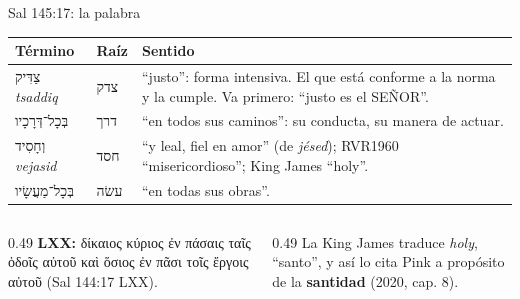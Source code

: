 \documentclass[hyperref={bookmarks=false},aspectratio=169]{beamer}
\newcommand{\heb}[1]{\mbox{\foreignlanguage{hebrew}{#1}}}
\newcommand{\grc}[1]{\foreignlanguage{ancientgreek}{#1}}
\newcommand{\SENOR}{S{\fontsize{0.78em}{1em}\selectfont EÑOR}}
\newcommand{\destacar}[1]{\textbf{\textcolor{azul}{#1}}}
\begin{document}
\begin{frame}{Sal 145:17: la palabra}
\scriptsize\renewcommand{\arraystretch}{1.15}
\begin{tabular}{@{}>{\RaggedRight\arraybackslash}p{2.8cm}>{\RaggedRight\arraybackslash}p{1.1cm}>{\RaggedRight\arraybackslash}p{8.0cm}@{}}
\toprule
\textbf{Término} & \textbf{Raíz} & \textbf{Sentido} \\ \midrule
\heb{צַדִּיק} \emph{tsaddiq} & \heb{צדק} & ``justo'': forma intensiva. El que está conforme a la norma y la cumple. Va primero: ``justo es el \SENOR''. \\
\heb{בְּכָל־דְּרָכָיו} & \heb{דרך} & ``en todos sus caminos'': su conducta, su manera de actuar. \\
\heb{וְחָסִיד} \emph{vejasid} & \heb{חסד} & ``y leal, fiel en amor'' (de \emph{jésed}); RVR1960 ``misericordioso''; King James ``holy''. \\
\heb{בְּכָל־מַעֲשָׂיו} & \heb{עשׂה} & ``en todas sus obras''. \\
\bottomrule
\end{tabular}\par\medskip
\begin{columns}[t,onlytextwidth]
\begin{column}{0.49\textwidth}\small
\textbf{LXX:} \grc{δίκαιος κύριος ἐν πάσαις ταῖς ὁδοῖς αὐτοῦ καὶ ὅσιος ἐν πᾶσι τοῖς ἔργοις αὐτοῦ} (Sal 144:17 LXX).
\end{column}
\begin{column}{0.49\textwidth}\small
La King James traduce \emph{holy}, ``santo'', y así lo cita Pink a propósito de la \destacar{santidad} (2020, cap. 8).
\end{column}
\end{columns}
\end{frame}
\end{document}
